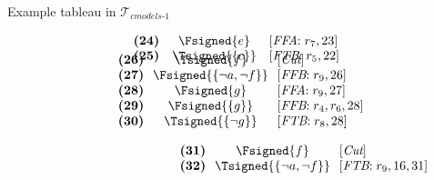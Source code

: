 \begin{frame}{Example tableau in $\mathcal{T}_{\textit{cmodels{-}1}}$}
\begin{center}
\begin{minipage}[t]{16cm}
\begin{minipage}[t]{6cm}
\[\begin{array}{lcl}
\textbf{(24)}                                      &
  \Fsigned{e}                                      &
  [\textit{FFA}{:}\;r_7, \text{23}]                \\
\textbf{(25)}                                      &
  \Tsigned{\{c\}}                                  &
  [\textit{FTB}{:}\;r_5, \text{22}]
\vspace{-0.7cm}
\end{array}
\]
%
\begin{minipage}[t]{1cm}
\[
\hspace{0.25cm}
\begin{array}{lcl}
\textbf{(26)}                                      &
  \Tsigned{f}                                      &
  [\textit{Cut}]                                   \\
\textbf{(27)}                                      & \hspace{-0.1cm}
  \Fsigned{\{\neg a,\neg f\}}      \hspace{-0.1cm} &
  [\textit{FFB}{:}\;r_9, \text{26}]                \\
\textbf{(28)}                                      &
  \Fsigned{g}                                      &
  [\textit{FFA}{:}\;r_9, \text{27}]                \\
\textbf{(29)}                                      &
  \Fsigned{\{g\}}                                  &
  [\textit{FFB}{:}\;r_4, r_6, \text{28}]            \\
\textbf{(30)}                                      &
  \Tsigned{\{\neg g\}}                     &
  [\textit{FTB}{:}\;r_8, \text{28}]                %
\end{array}
\]
\end{minipage}
%
\begin{minipage}[t]{2cm}
\[
\hspace{3.75cm}
\begin{array}{lcl}
\textbf{(31)}                                      &
  \Fsigned{f}                                      &
  [\textit{Cut}]                                   \\
\textbf{(32)}                                      & \hspace{-0.1cm}
  \Tsigned{\{\neg a,\neg f\}}      \hspace{-0.1cm} &
  [\textit{FTB}{:}\;r_9, \text{16}, \text{31}]     \\

\end{array}\]
\end{minipage}
\end{minipage}
\end{minipage}
\end{center}
\end{frame}

